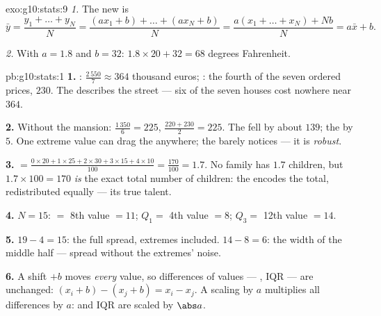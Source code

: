 \begin{solution}{exo:g10:stats:9}
\emph{1.} The new  is
\[
\bar y = \frac{y_1 + \dots + y_N}{N}
= \frac{(a x_1 + b) + \dots + (a x_N + b)}{N}
= \frac{a(x_1 + \dots + x_N) + Nb}{N}
= a \bar x + b .
\]

\emph{2.} With $a = 1.8$ and $b = 32$: 
$1.8 \times 20 + 32 = 68$ degrees Fahrenheit.
\end{solution}

\begin{solution}{pb:g10:stats:1}
\textbf{1.} : $\frac{2\,550}{7} \approx 364$ thousand
euros; : the fourth of the seven ordered prices, $230$.
The  describes the street --- six of the seven houses
cost nowhere near $364$.

\textbf{2.} Without the mansion:  $\frac{1\,350}{6} = 225$,
 $\frac{220 + 230}{2} = 225$. The  fell by about
$139$; the  by $5$. One extreme value can drag the 
anywhere; the  barely notices --- it is \emph{robust}.

\textbf{3.}  $= \frac{0 \times 20 + 1 \times 25 + 2 \times
30 + 3 \times 15 + 4 \times 10}{100} = \frac{170}{100} = 1.7$.
No family has $1.7$ children, but $1.7 \times 100 = 170$
\emph{is} the exact total number of children: the  encodes
the total, redistributed equally --- its true talent.

\textbf{4.} $N = 15$:  $=$ 8th value $= 11$;
$Q_1 =$ 4th value $= 8$; $Q_3 =$ 12th value $= 14$.

\textbf{5.}  $19 - 4 = 15$: the full spread, extremes
included.  $14 - 8 = 6$: the width of the
middle half --- spread without the extremes' noise.

\textbf{6.} A shift $+b$ moves \emph{every} value, so
differences of values --- , IQR --- are unchanged:
$(x_i + b) - (x_j + b) = x_i - x_j$. A scaling by $a$
multiplies all differences by $a$:  and IQR are scaled by
$\abs a$.


\end{solution}
